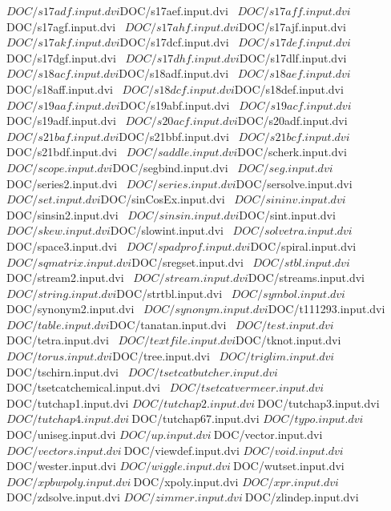 \documentclass{article}
\begin{document}
  ${DOC}/s17adf.input.dvi      ${DOC}/s17aef.input.dvi     \
  ${DOC}/s17aff.input.dvi      ${DOC}/s17agf.input.dvi     \
  ${DOC}/s17ahf.input.dvi      ${DOC}/s17ajf.input.dvi     \
  ${DOC}/s17akf.input.dvi      ${DOC}/s17dcf.input.dvi     \
  ${DOC}/s17def.input.dvi      ${DOC}/s17dgf.input.dvi     \
  ${DOC}/s17dhf.input.dvi      ${DOC}/s17dlf.input.dvi     \
  ${DOC}/s18acf.input.dvi      ${DOC}/s18adf.input.dvi     \
  ${DOC}/s18aef.input.dvi      ${DOC}/s18aff.input.dvi     \
  ${DOC}/s18dcf.input.dvi      ${DOC}/s18def.input.dvi     \
  ${DOC}/s19aaf.input.dvi      ${DOC}/s19abf.input.dvi     \
  ${DOC}/s19acf.input.dvi      ${DOC}/s19adf.input.dvi     \
  ${DOC}/s20acf.input.dvi      ${DOC}/s20adf.input.dvi     \
  ${DOC}/s21baf.input.dvi      ${DOC}/s21bbf.input.dvi     \
  ${DOC}/s21bcf.input.dvi      ${DOC}/s21bdf.input.dvi     \
  ${DOC}/saddle.input.dvi      ${DOC}/scherk.input.dvi     \
  ${DOC}/scope.input.dvi       ${DOC}/segbind.input.dvi    \
  ${DOC}/seg.input.dvi         ${DOC}/series2.input.dvi    \
  ${DOC}/series.input.dvi      ${DOC}/sersolve.input.dvi   \
  ${DOC}/set.input.dvi         ${DOC}/sinCosEx.input.dvi   \
  ${DOC}/sininv.input.dvi      ${DOC}/sinsin2.input.dvi    \
  ${DOC}/sinsin.input.dvi      ${DOC}/sint.input.dvi       \
  ${DOC}/skew.input.dvi        ${DOC}/slowint.input.dvi    \
  ${DOC}/solvetra.input.dvi    ${DOC}/space3.input.dvi     \
  ${DOC}/spadprof.input.dvi    ${DOC}/spiral.input.dvi     \
  ${DOC}/sqmatrix.input.dvi    ${DOC}/sregset.input.dvi    \
  ${DOC}/stbl.input.dvi        ${DOC}/stream2.input.dvi    \
  ${DOC}/stream.input.dvi      ${DOC}/streams.input.dvi    \
  ${DOC}/string.input.dvi      ${DOC}/strtbl.input.dvi     \
  ${DOC}/symbol.input.dvi      ${DOC}/synonym2.input.dvi   \
  ${DOC}/synonym.input.dvi     ${DOC}/t111293.input.dvi    \
  ${DOC}/table.input.dvi       ${DOC}/tanatan.input.dvi    \
  ${DOC}/test.input.dvi        ${DOC}/tetra.input.dvi      \
  ${DOC}/textfile.input.dvi    ${DOC}/tknot.input.dvi      \
  ${DOC}/torus.input.dvi       ${DOC}/tree.input.dvi       \
  ${DOC}/triglim.input.dvi     ${DOC}/tschirn.input.dvi    \
  ${DOC}/tsetcatbutcher.input.dvi    \
  ${DOC}/tsetcatchemical.input.dvi   \
  ${DOC}/tsetcatvermeer.input.dvi    \
  ${DOC}/tutchap1.input.dvi    ${DOC}/tutchap2.input.dvi   \
  ${DOC}/tutchap3.input.dvi    ${DOC}/tutchap4.input.dvi   \
  ${DOC}/tutchap67.input.dvi   ${DOC}/typo.input.dvi       \
  ${DOC}/uniseg.input.dvi      ${DOC}/up.input.dvi         \
  ${DOC}/vector.input.dvi      ${DOC}/vectors.input.dvi    \
  ${DOC}/viewdef.input.dvi     ${DOC}/void.input.dvi       \
  ${DOC}/wester.input.dvi      ${DOC}/wiggle.input.dvi     \
  ${DOC}/wutset.input.dvi      ${DOC}/xpbwpoly.input.dvi   \
  ${DOC}/xpoly.input.dvi       ${DOC}/xpr.input.dvi        \
  ${DOC}/zdsolve.input.dvi     ${DOC}/zimmer.input.dvi     \
  ${DOC}/zlindep.input.dvi
\end{document}
